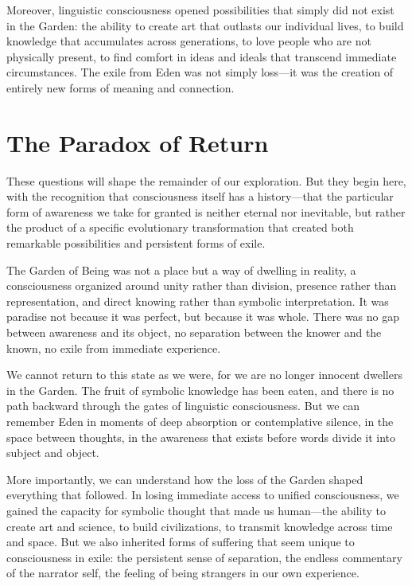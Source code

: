 Moreover, linguistic consciousness opened possibilities that simply did not exist in the Garden: the ability to create art that outlasts our individual lives, to build knowledge that accumulates across generations, to love people who are not physically present, to find comfort in ideas and ideals that transcend immediate circumstances. The exile from Eden was not simply loss—it was the creation of entirely new forms of meaning and connection.

\section{The Paradox of Return}

These questions will shape the remainder of our exploration. But they begin here, with the recognition that consciousness itself has a history—that the particular form of awareness we take for granted is neither eternal nor inevitable, but rather the product of a specific evolutionary transformation that created both remarkable possibilities and persistent forms of exile.

The Garden of Being was not a place but a way of dwelling in reality, a consciousness organized around unity rather than division, presence rather than representation, and direct knowing rather than symbolic interpretation. It was paradise not because it was perfect, but because it was whole. There was no gap between awareness and its object, no separation between the knower and the known, no exile from immediate experience.

We cannot return to this state as we were, for we are no longer innocent dwellers in the Garden. The fruit of symbolic knowledge has been eaten, and there is no path backward through the gates of linguistic consciousness. But we can remember Eden in moments of deep absorption or contemplative silence, in the space between thoughts, in the awareness that exists before words divide it into subject and object.

More importantly, we can understand how the loss of the Garden shaped everything that followed. In losing immediate access to unified consciousness, we gained the capacity for symbolic thought that made us human—the ability to create art and science, to build civilizations, to transmit knowledge across time and space. But we also inherited forms of suffering that seem unique to consciousness in exile: the persistent sense of separation, the endless commentary of the narrator self, the feeling of being strangers in our own experience.

